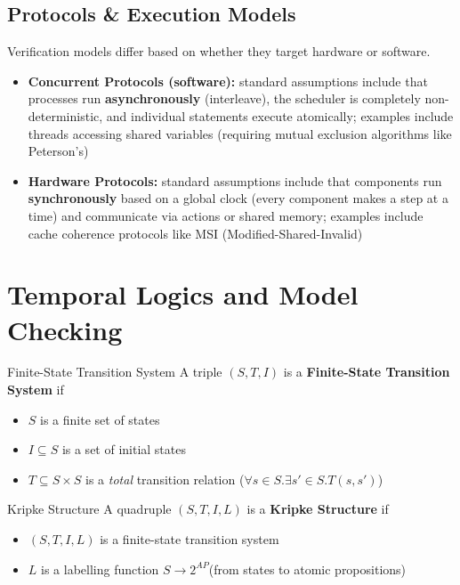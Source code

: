 \documentclass[a4paper, 11pt]{report}
\begin{document}
\section{Protocols \& Execution Models}

Verification models differ based on whether they target hardware or software.

\begin{itemize}
    \item \textbf{Concurrent Protocols (software):} standard assumptions include that processes run \textbf{asynchronously} (interleave), the scheduler is completely non-deterministic, and individual statements execute atomically; examples include threads accessing shared variables (requiring mutual exclusion algorithms like Peterson's)
    \item \textbf{Hardware Protocols:} standard assumptions include that components run \textbf{synchronously} based on a global clock (every component makes a step at a time) and communicate via actions or shared memory; examples include cache coherence protocols like MSI (Modified-Shared-Invalid)
\end{itemize}

\chapter{Temporal Logics and Model Checking}

\begin{defframe}{Finite-State Transition System}{}
    A triple $(S, T, I)$ is a \textbf{Finite-State Transition System} if 
    \begin{itemize}
        \item $S$ is a finite set of states
        \item $I \subseteq S$ is a set of initial states
        \item $T \subseteq S \times S$ is a \textit{total} transition relation ($\forall s \in S. \exists s' \in S . T(s, s')  $)
    \end{itemize}
\end{defframe}

\begin{defframe}{Kripke Structure}{}
    A quadruple $(S, T, I, L)$ is a \textbf{Kripke Structure} if 
    \begin{itemize}
        \item $(S, T, I, L)$ is a finite-state transition system
        \item $L$ is a labelling function $S \to 2^{AP}$(from states to atomic propositions)
    \end{itemize}
\end{defframe}
\end{document}
